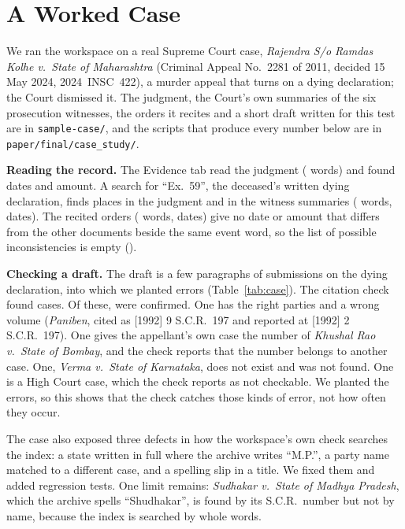 \section{A Worked Case}
\label{sec:case}
We ran the workspace on a real Supreme Court case, \emph{Rajendra S/o Ramdas Kolhe v.\ State of Maharashtra} (Criminal Appeal No.~2281 of 2011, decided 15 May 2024, 2024~INSC~422), a murder appeal that turns on a dying declaration; the Court dismissed it. The judgment, the Court's own summaries of the six prosecution witnesses, the orders it recites and a short draft written for this test are in \texttt{sample-case/}, and the scripts that produce every number below are in \texttt{paper/final/case\_study/}.

\textbf{Reading the record.} The Evidence tab read the judgment (\CaseJudgWords{} words) and found \CaseJudgDates{} dates and \CaseJudgAmounts{} amount. A search for ``Ex.~59'', the deceased's written dying declaration, finds \CaseJudgExhibit{} places in the judgment and \CaseStmtExhibit{} in the witness summaries (\CaseStmtWords{} words, \CaseStmtDates{} dates). The recited orders (\CaseOrdersWords{} words, \CaseOrdersDates{} dates) give no date or amount that differs from the other documents beside the same event word, so the list of possible inconsistencies is empty (\CaseInconsistencies).

\textbf{Checking a draft.} The draft is a few paragraphs of submissions on the dying declaration, into which we planted errors (Table~\ref{tab:case}). The citation check found \CaseCiteFound{} cases. Of these, \CaseCiteVerified{} were confirmed. One has the right parties and a wrong volume (\emph{Paniben}, cited as [1992] 9 S.C.R.\ 197 and reported at [1992] 2 S.C.R.\ 197). One gives the appellant's own case the number of \emph{Khushal Rao v.\ State of Bombay}, and the check reports that the number belongs to another case. One, \emph{Verma v.\ State of Karnataka}, does not exist and was not found. One is a High Court case, which the check reports as not checkable. We planted the errors, so this shows that the check catches those kinds of error, not how often they occur.

\begin{table}[t]
\caption{The draft with planted errors and what the workspace's citation check reported.}
\label{tab:case}
\centering
\footnotesize
\setlength{\tabcolsep}{3pt}

\end{table}

The case also exposed three defects in how the workspace's own check searches the index: a state written in full where the archive writes ``M.P.'', a party name matched to a different case, and a spelling slip in a title. We fixed them and added regression tests. One limit remains: \emph{Sudhakar v.\ State of Madhya Pradesh}, which the archive spells ``Shudhakar'', is found by its S.C.R.\ number but not by name, because the index is searched by whole words.

